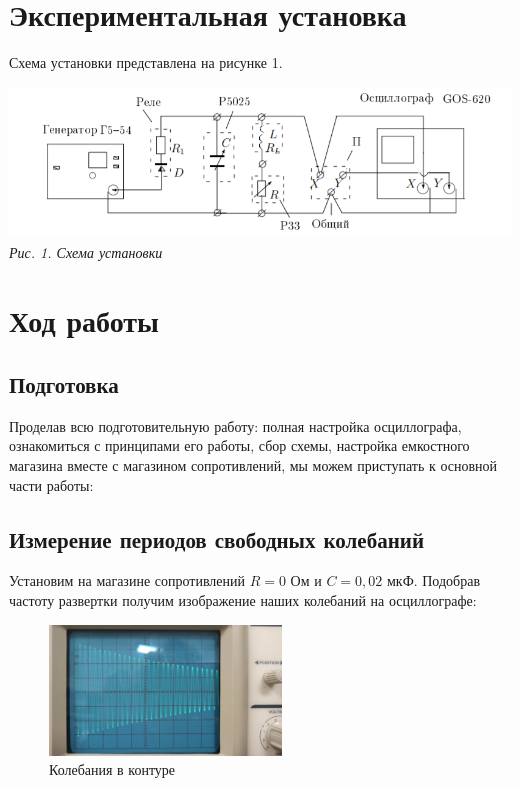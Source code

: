 \documentclass[a4paper, 12pt]{article}%
\begin{document}
\section{Экспериментальная установка}

Схема установки представлена на рисунке 1.

\begin{center}

    \includegraphics[scale=0.6]{324_scheme.png} \\
    \textit{Рис. 1. Схема установки}

\end{center}

\section{Ход работы}

\subsection{Подготовка}

Проделав всю подготовительную работу: полная настройка осциллографа, ознакомиться с принципами его работы, сбор схемы, настройка емкостного магазина вместе с магазином сопротивлений, мы можем приступать к основной части работы:


\subsection{Измерение периодов свободных колебаний}

Установим на магазине сопротивлений $R = 0$ Ом и $C = 0,02$ мкФ. Подобрав частоту развертки получим изображение наших колебаний на осциллографе:


\begin{figure}[h!]
\begin{center}
\includegraphics[width = 0.55\textwidth]{my1.jpg}
\caption{Колебания в контуре}
\end{center}
\end{figure}
\end{document}
